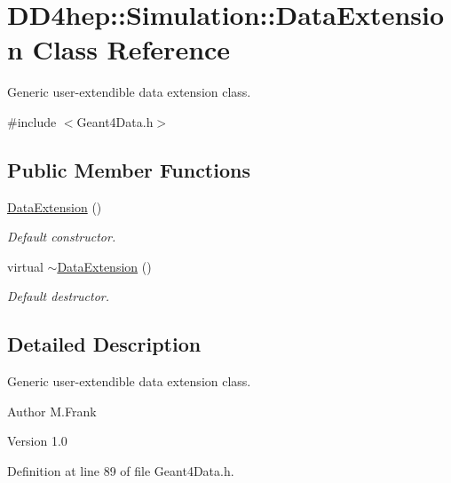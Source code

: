 \hypertarget{class_d_d4hep_1_1_simulation_1_1_data_extension}{
\section{DD4hep::Simulation::DataExtension Class Reference}
\label{class_d_d4hep_1_1_simulation_1_1_data_extension}
}


Generic user-\/extendible data extension class.  


{\ttfamily \#include $<$Geant4Data.h$>$}\subsection*{Public Member Functions}
\begin{DoxyCompactItemize}
\item 
\hyperlink{class_d_d4hep_1_1_simulation_1_1_data_extension_a404504756d040999b53938a61bcb2f53}{DataExtension} ()
\begin{DoxyCompactList}\small\item\em Default constructor. \item\end{DoxyCompactList}\item 
virtual \hyperlink{class_d_d4hep_1_1_simulation_1_1_data_extension_a088b1be47c96c8b6ab44527bfa1f60bc}{$\sim$DataExtension} ()
\begin{DoxyCompactList}\small\item\em Default destructor. \item\end{DoxyCompactList}\end{DoxyCompactItemize}


\subsection{Detailed Description}
Generic user-\/extendible data extension class. \begin{DoxyAuthor}{Author}
M.Frank 
\end{DoxyAuthor}
\begin{DoxyVersion}{Version}
1.0 
\end{DoxyVersion}


Definition at line 89 of file Geant4Data.h.

